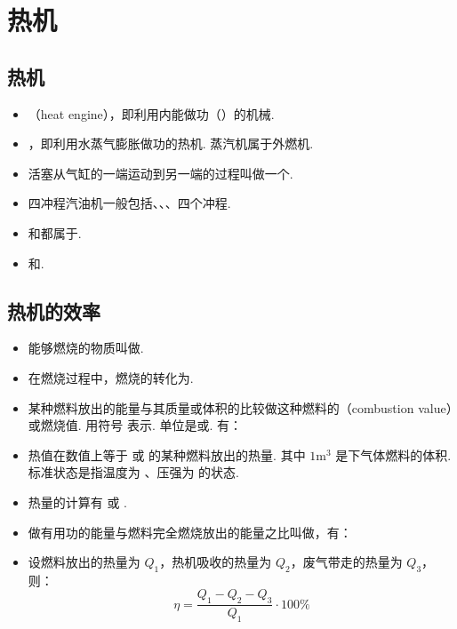 \newpage
\section{热机}

\subsection{热机}
\vspace{10pt}
\begin{itemize}
\item {}（heat engine），即利用内能做功（）的机械.
\item {}，即利用水蒸气膨胀做功的热机. 蒸汽机属于外燃机.
\item 活塞从气缸的一端运动到另一端的过程叫做一个.
\item 四冲程汽油机一般包括、、、四个冲程.
\item {}和都属于.
\item {}和.
\end{itemize}

\subsection{热机的效率}
\vspace{10pt}
\begin{itemize}
\item 能够燃烧的物质叫做.
\item 在燃烧过程中，燃烧的转化为.
\item 某种燃料放出的能量与其质量或体积的比较做这种燃料的（combustion value）或燃烧值. 用符号  表示. 单位是或. 有：
\item 热值在数值上等于  或  的某种燃料放出的热量. 其中 $1\text{m}^3$ 是下气体燃料的体积. 标准状态是指温度为 、压强为  的状态.
\item 热量的计算有  或 .
\item 做有用功的能量与燃料完全燃烧放出的能量之比叫做，有：
\item 设燃料放出的热量为 $Q_1$，热机吸收的热量为 $Q_2$，废气带走的热量为 $Q_3$，则：
$$
\eta=\frac{Q_1-Q_2-Q_3}{Q_1}\cdot100\%
$$
\end{itemize}
